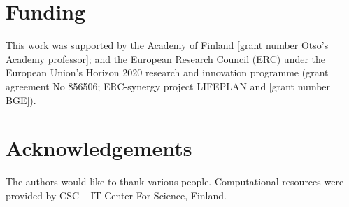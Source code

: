 \documentclass[
]{article}
\begin{document}
\section*{Funding}\label{funding}

This work was supported by the Academy of Finland {[}grant number Otso's Academy professor{]}; and the European Research Council (ERC) under the European Union's Horizon 2020 research and innovation programme (grant agreement No 856506; ERC-synergy project LIFEPLAN and {[}grant number BGE{]}).

\section*{Acknowledgements}\label{acknowledgements}

The authors would like to thank various people. Computational resources were provided by CSC -- IT Center For Science, Finland.
\end{document}
